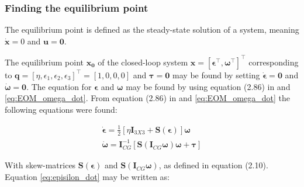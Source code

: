 \subsubsection*{Finding the equilibrium point}

The equilibrium point is defined as the steady-state solution of a system, meaning $\dot{\mathbf{x}} = 0$ and $\mathbf{u}= \mathbf{0}$. 

The equilibrium point $\mathbf{x_0}$ of the closed-loop system $\mathbf{x} = [ \boldsymbol{\epsilon}^\top, \boldsymbol{\omega}^\top]^\top$ corresponding to $\mathbf{q} = [\eta,\epsilon_1, \epsilon_2, \epsilon_3]^\top = [1, 0, 0, 0]$ and $\boldsymbol{\tau} = \boldsymbol{0}$ may be found by setting $\dot{\boldsymbol{\epsilon}} = \mathbf{0}$ and $\dot{\boldsymbol{\omega}} = \mathbf{0}$. The equation for $\boldsymbol{\epsilon}$ and $\boldsymbol{\omega}$ may be found by using equation (2.86) in \cite{Fossen2011} and \eqref{eq:EOM_omega_dot}. From equation (2.86) in \cite{Fossen2011} and \eqref{eq:EOM_omega_dot} the following equations were found:

\begin{subequations}
\label{eq:x_dot}
	\begin{align}
		\dot{\boldsymbol{\epsilon}} =  \frac{1}{2} [ \eta \mathbf{I}_{3X3} + \mathbf{S}(\boldsymbol{\epsilon}) ] \boldsymbol{\omega}  \label{eq:episilon_dot} \\
		 \dot{\boldsymbol{\omega}} = \mathbf{I}_{CG}^{-1} [\mathbf{S} (\mathbf{I}_{CG} \boldsymbol{\omega} ) \boldsymbol{\omega} +  \boldsymbol{\tau} ] \label{eq:omega_dot}
	\end{align}	
\end{subequations}


With skew-matrices $\mathbf{S} (\boldsymbol{\epsilon})$ and $\mathbf{S} (\mathbf{I}_{CG} \boldsymbol{\omega} ) $, as defined in \cite{Fossen2011} equation (2.10). Equation \eqref{eq:episilon_dot} may be written as:


